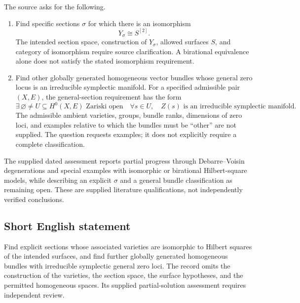 \documentclass[11pt]{article}
\begin{document}
The source asks for the following.
\begin{enumerate}
\item Find specific sections \(\sigma\) for which there is an isomorphism
\[
Y_\sigma\cong S^{[2]}.
\]
The intended section space, construction of \(Y_\sigma\), allowed surfaces \(S\), and category of isomorphism require source clarification. A birational equivalence alone does not satisfy the stated isomorphism requirement.
\item Find other globally generated homogeneous vector bundles whose general zero locus is an irreducible symplectic manifold. For a specified admissible pair \((X,E)\), the general-section requirement has the form
\[
\exists\,\varnothing\ne U\subseteq H^0(X,E)\text{ Zariski open}\quad
\forall s\in U,\quad Z(s)\text{ is an irreducible symplectic manifold}.
\]
The admissible ambient varieties, groups, bundle ranks, dimensions of zero loci, and examples relative to which the bundles must be ``other'' are not supplied. The question requests examples; it does not explicitly require a complete classification.
\end{enumerate}
The supplied dated assessment reports partial progress through Debarre--Voisin degenerations and special examples with isomorphic or birational Hilbert-square models, while describing an explicit \(\sigma\) and a general bundle classification as remaining open. These are supplied literature qualifications, not independently verified conclusions.
\subsection{Short English statement}
Find explicit sections whose associated varieties are isomorphic to Hilbert squares of the intended surfaces, and find further globally generated homogeneous bundles with irreducible symplectic general zero loci. The record omits the construction of the varieties, the section space, the surface hypotheses, and the permitted homogeneous spaces. Its supplied partial-solution assessment requires independent review.
\end{document}
